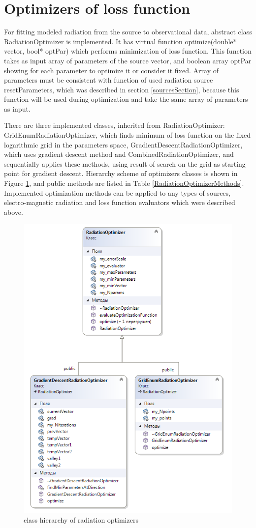 \section{Optimizers of loss function}

For fitting modeled radiation from the source to observational data, abstract class RadiationOptimizer is implemented. It has virtual function optimize(double* vector, bool* optPar) which performs minimization of loss function. This function takes as input array of parameters of the source vector, and boolean array optPar showing for each parameter to optimize it or consider it fixed. Array of parameters must be consistent with function of used radiation source resetParameters, which was described in section \ref{sourcesSection}, because this function will be used during optimization and take the same array of parameters as input.

There are three implemented classes, inherited from RadiationOptimizer: GridEnumRadiationOptimizer, which finds minimum of loss function on the fixed logarithmic grid in the parameters space, GradientDescentRadiationOptimizer, which uses gradient descent method and CombinedRadiationOptimizer, and sequentially applies these methods, using result of search on the grid as starting point for gradient descent. Hierarchy scheme of optimizers classes is shown in Figure \ref{radiationOptimizer}, and public methods are listed in Table \ref{RadiationOptimizerMethods}. Implemented optimization methods can be applied to any types of sources, electro-magnetic radiation and loss function evaluators which were described above.
\begin{figure}
	\centering
	\includegraphics[width=11.5 cm]{./fig/radiationOptimizer.png} 
	\caption{class hierarchy of radiation optimizers}
	\label{radiationOptimizer}
\end{figure}

